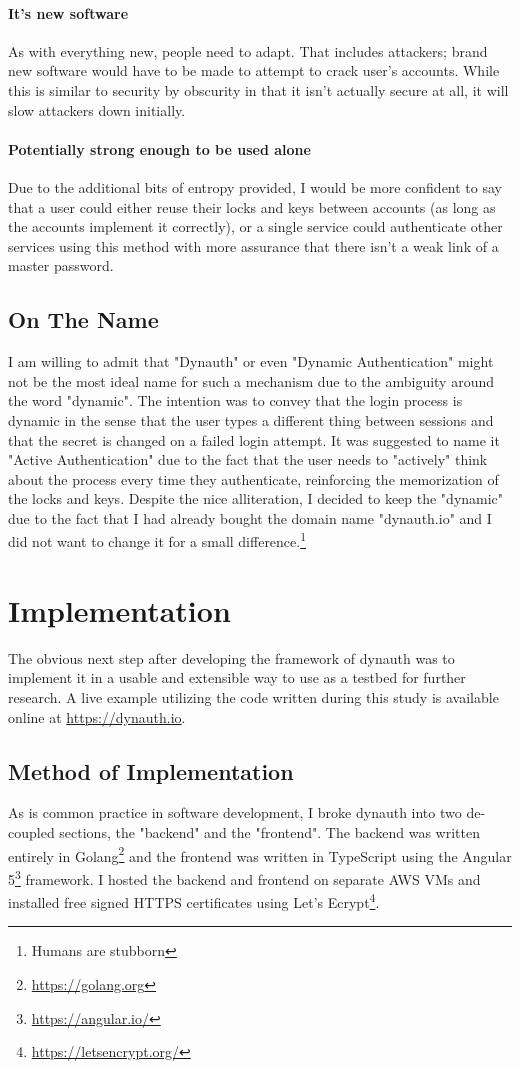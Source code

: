 \documentclass[conference]{IEEEtran}
\begin{document}
	\paragraph{It's new software} As with everything new, people need to adapt. That includes attackers; brand new software would have to be made to attempt to crack user's accounts. While this is similar to security by obscurity in that it isn't actually secure at all, it will slow attackers down initially.
	\paragraph{Potentially strong enough to be used alone} Due to the additional bits of entropy provided, I would be more confident to say that a user could either reuse their locks and keys between accounts (as long as the accounts implement it correctly), or a single service could authenticate other services using this method with more assurance that there isn't a weak link of a master password.
\subsection{On The Name}
	I am willing to admit that "Dynauth" or even "Dynamic Authentication" might not be the most ideal name for such a mechanism due to the ambiguity around the word "dynamic". The intention was to convey that the login process is dynamic in the sense that the user types a different thing between sessions and that the secret is changed on a failed login attempt. It was suggested to name it "Active Authentication" due to the fact that the user needs to "actively" think about the process every time they authenticate, reinforcing the memorization of the locks and keys. Despite the nice alliteration, I decided to keep the "dynamic" due to the fact that I had already bought the domain name "dynauth.io" and I did not want to change it for a small difference.\footnote{Humans are stubborn}
	
\section{Implementation}
	The obvious next step after developing the framework of dynauth was to implement it in a usable and extensible way to use as a testbed for further research. A live example utilizing the code written during this study is available online at \url{https://dynauth.io}.
\subsection{Method of Implementation}
	As is common practice in software development, I broke dynauth into two de-coupled sections, the "backend" and the "frontend". The backend was written entirely in Golang\footnote{\url{https://golang.org}} and the frontend was written in TypeScript using the Angular 5\footnote{\url{https://angular.io/}} framework. I hosted the backend and frontend on separate AWS VMs and installed free signed HTTPS certificates using Let's Ecrypt\footnote{\url{https://letsencrypt.org/}}.
\end{document}
